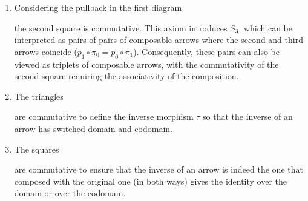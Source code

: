\begin{definition}
\begin{enumerate}[\bfseries (G1)]
        \item Considering the pullback in the first diagram
        \begin{center}
        \end{center} the second square is commutative. This axiom introduces $S_3$, which can be interpreted as pairs of pairs of composable arrows where the second and third arrows coincide ($p_1\circ \pi_0 = p_0\circ \pi_1$). Consequently, these pairs can also be viewed as triplets of composable arrows, with the commutativity of the second square requiring the associativity of the composition.

        \item The triangles
        \begin{center}
        \end{center} are commutative to define the inverse morphism $\tau$ so that the inverse of an arrow has switched domain and codomain.

        \item The squares
        \begin{center}
        \end{center} are commutative to ensure that the inverse of an arrow is indeed the one that composed with the original one (in both ways) gives the identity over the domain or over the codomain.
    \end{enumerate}
\end{definition}
